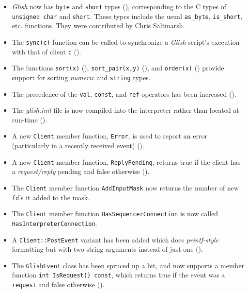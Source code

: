 \begin{itemize}
\item \emph{Glish} now has \texttt{byte} and \texttt{short} types (),
corresponding to the C types of \texttt{unsigned char} and \texttt{short}.  These
types include the usual \texttt{as\_byte}, \texttt{is\_short}, etc. functions.
They were contributed by Chris Saltmarsh.

\item The \texttt{sync(c)} function can be called to synchronize a \emph{Glish}
script's execution with that of client \texttt{c} ().

\item The functions \texttt{sort(x)} (),
\texttt{sort\_pair(x,y)} (),
and \texttt{order(x)} ()
provide support for sorting \emph{numeric} and \texttt{string} types.

\item The precedence of the \texttt{val}, \texttt{const}, and \texttt{ref}
operators has been increased ().

\item The \emph{glish.init} file is now compiled into the interpreter
rather than located at run-time ().

\item A new \texttt{Client} member function, \texttt{Error}, is used to
report an error (particularly in a recently received event)
().

\item A new \texttt{Client} member function, \texttt{ReplyPending}, returns
true if the client has a \emph{request/reply} pending and false otherwise
().

\item The \texttt{Client} member function \texttt{AddInputMask} now returns
the number of new \texttt{fd}'s it added to the mask.

\item The \texttt{Client} member function \texttt{HasSequencerConnection} is
now called \texttt{HasInterpreterConnection}.

\item A \texttt{Client::PostEvent} variant has been added which does
\emph{printf-style} formatting but with two string arguments instead
of just one ().

\item The \texttt{GlishEvent} class has been spruced up a bit, and now
supports a member function \texttt{int IsRequest() const}, which returns
true if the event was a \texttt{request} and false otherwise
().


\end{itemize}
